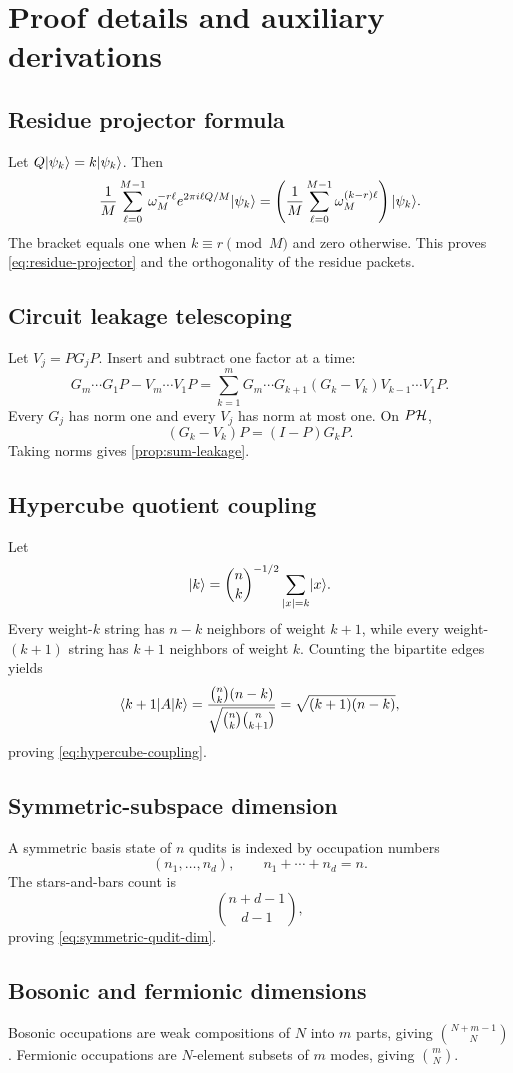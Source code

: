 \chapter{Proof details and auxiliary derivations}
\label{app:proofs}

\section{Residue projector formula}
Let $Q\lvert \psi_k\rangle=k\lvert \psi_k\rangle$. Then
\[
\frac1M\sum_{\ell=0}^{M-1}
\omega_M^{-r\ell}e^{2\pi i\ell Q/M}\lvert \psi_k\rangle
=
\left(
\frac1M\sum_{\ell=0}^{M-1}
\omega_M^{(k-r)\ell}
\right)\lvert \psi_k\rangle.
\]
The bracket equals one when $k\equiv r\pmod M$ and zero otherwise. This proves \cref{eq:residue-projector} and the orthogonality of the residue packets.

\section{Circuit leakage telescoping}
Let $V_j=PG_jP$. Insert and subtract one factor at a time:
\[
G_m\cdots G_1P-V_m\cdots V_1P
=
\sum_{k=1}^m
G_m\cdots G_{k+1}(G_k-V_k)V_{k-1}\cdots V_1P.
\]
Every $G_j$ has norm one and every $V_j$ has norm at most one. On $P\mathcal H$,
\[
(G_k-V_k)P=(I-P)G_kP.
\]
Taking norms gives \cref{prop:sum-leakage}.

\section{Hypercube quotient coupling}
Let
\[
\lvert k\rangle
=
\binom nk^{-1/2}
\sum_{|x|=k}\lvert x\rangle.
\]
Every weight-$k$ string has $n-k$ neighbors of weight $k+1$, while every weight-$(k+1)$ string has $k+1$ neighbors of weight $k$. Counting the bipartite edges yields
\[
\langle k+1\rvert A\lvert k\rangle
=
\frac{\binom nk(n-k)}
{\sqrt{\binom nk\binom n{k+1}}}
=
\sqrt{(k+1)(n-k)},
\]
proving \cref{eq:hypercube-coupling}.

\section{Symmetric-subspace dimension}
A symmetric basis state of $n$ qudits is indexed by occupation numbers
\[
(n_1,\ldots,n_d),
\qquad
n_1+\cdots+n_d=n.
\]
The stars-and-bars count is
\[
\binom{n+d-1}{d-1},
\]
proving \cref{eq:symmetric-qudit-dim}.

\section{Bosonic and fermionic dimensions}
Bosonic occupations are weak compositions of $N$ into $m$ parts, giving $\binom{N+m-1}{N}$. Fermionic occupations are $N$-element subsets of $m$ modes, giving $\binom mN$.

